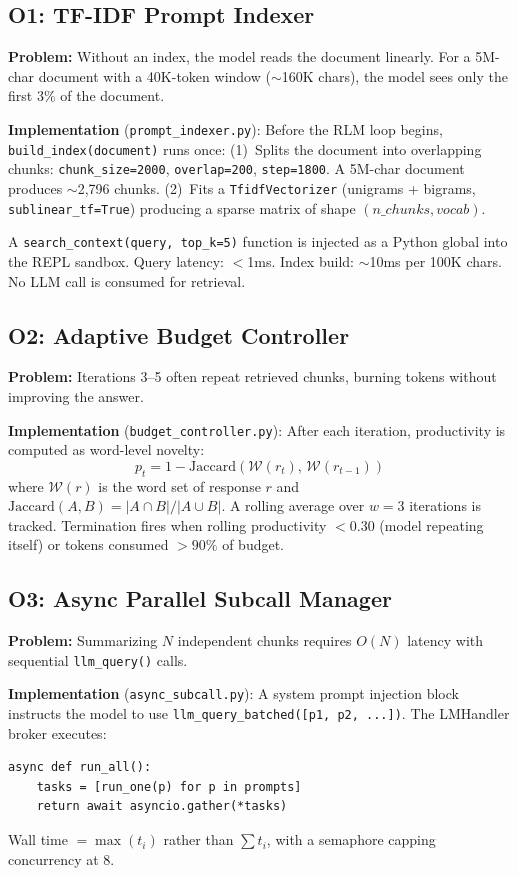\documentclass{article}
\begin{document}
\subsection{O1: TF-IDF Prompt Indexer}
\textbf{Problem:} Without an index, the model reads the document linearly. For a 5M-char document with a 40K-token window ($\sim$160K chars), the model sees only the first 3\% of the document.

\textbf{Implementation} (\texttt{prompt\_indexer.py}): Before the RLM loop begins, \texttt{build\_index(document)} runs once:
(1)~Splits the document into overlapping chunks: \texttt{chunk\_size=2000}, \texttt{overlap=200}, \texttt{step=1800}. A 5M-char document produces $\sim$2,796 chunks.
(2)~Fits a \texttt{TfidfVectorizer} (unigrams + bigrams, \texttt{sublinear\_tf=True}) producing a sparse matrix of shape $(n\_chunks, vocab)$.

A \texttt{search\_context(query, top\_k=5)} function is injected as a Python global into the REPL sandbox. Query latency: $<$1ms. Index build: $\sim$10ms per 100K chars. No LLM call is consumed for retrieval.

\subsection{O2: Adaptive Budget Controller}
\textbf{Problem:} Iterations 3--5 often repeat retrieved chunks, burning tokens without improving the answer.

\textbf{Implementation} (\texttt{budget\_controller.py}): After each iteration, productivity is computed as word-level novelty:
\begin{equation}
p_t = 1 - \text{Jaccard}(\mathcal{W}(r_t),\, \mathcal{W}(r_{t-1}))
\end{equation}
where $\mathcal{W}(r)$ is the word set of response $r$ and $\text{Jaccard}(A,B) = |A \cap B| / |A \cup B|$. A rolling average over $w=3$ iterations is tracked. Termination fires when rolling productivity $< 0.30$ (model repeating itself) or tokens consumed $> 90\%$ of budget.

\subsection{O3: Async Parallel Subcall Manager}
\textbf{Problem:} Summarizing $N$ independent chunks requires $O(N)$ latency with sequential \texttt{llm\_query()} calls.

\textbf{Implementation} (\texttt{async\_subcall.py}): A system prompt injection block instructs the model to use \texttt{llm\_query\_batched([p1, p2, ...])}. The LMHandler broker executes:
\begin{verbatim}
async def run_all():
    tasks = [run_one(p) for p in prompts]
    return await asyncio.gather(*tasks)
\end{verbatim}
Wall time $= \max(t_i)$ rather than $\sum t_i$, with a semaphore capping concurrency at 8.
\end{document}
